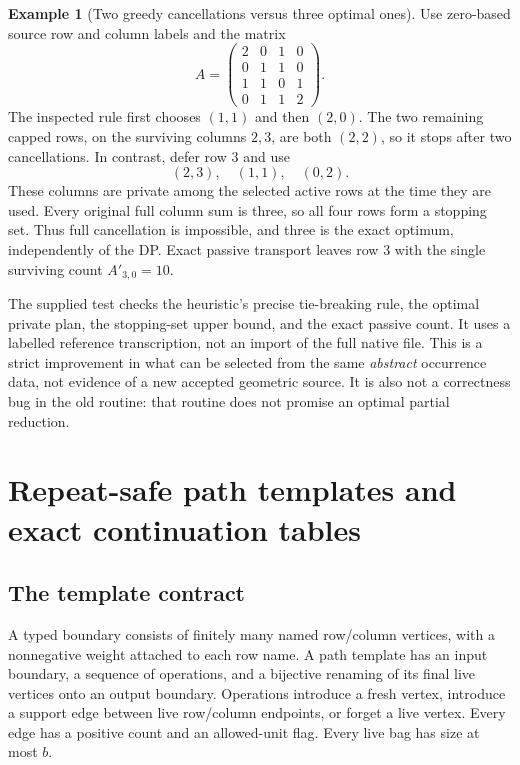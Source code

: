 \documentclass[11pt,a4paper]{article}
\theoremstyle{definition}
\newtheorem{example}[theorem]{Example}
\theoremstyle{remark}
\begin{document}
\begin{example}[Two greedy cancellations versus three optimal ones]
\label{ex:minfill}
Use zero-based source row and column labels and the matrix
\[
 A=\begin{pmatrix}
 2&0&1&0\\
 0&1&1&0\\
 1&1&0&1\\
 0&1&1&2
 \end{pmatrix}.
\]
The inspected rule first chooses $(1,1)$ and then $(2,0)$. The two
remaining capped rows, on the surviving columns $2,3$, are both $(2,2)$,
so it stops after two cancellations. In contrast, defer row $3$ and use
\[
 (2,3),\quad (1,1),\quad (0,2).
\]
These columns are private among the selected active rows at the time they
are used. Every original full column sum is three, so all four rows form
a stopping set. Thus full cancellation is impossible, and three is the
exact optimum, independently of the DP. Exact passive transport leaves
row $3$ with the single surviving count $A'_{3,0}=10$.
\end{example}

The supplied test checks the heuristic's precise tie-breaking rule, the
optimal private plan, the stopping-set upper bound, and the exact passive
count. It uses a labelled reference transcription, not an import of the
full native file. This is a strict improvement in what can be selected
from the same \emph{abstract} occurrence data, not evidence of a new
accepted geometric source. It is also not a correctness bug in the old
routine: that routine does not promise an optimal partial reduction.

\section{Repeat-safe path templates and exact continuation tables}
\label{sec:templates}

\subsection{The template contract}
A typed boundary consists of finitely many named row/column vertices, with
a nonnegative weight attached to each row name. A path template has an
input boundary, a sequence of operations, and a bijective renaming of its
final live vertices onto an output boundary. Operations introduce a fresh
vertex, introduce a support edge between live row/column endpoints, or
forget a live vertex. Every edge has a positive count and an allowed-unit
flag. Every live bag has size at most $b$.
\end{document}
